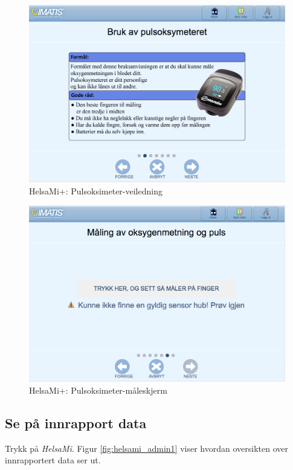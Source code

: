 \begin{figure}
\includegraphics[width=1.0\textwidth,center]{fig/helsami/pulsoksimeter_veiledning}
\caption{HelsaMi+: Pulsoksimeter-veiledning}
\label{fig:helsami_pulsoksimeter_veiledning}
\end{figure}

\begin{figure}
\includegraphics[width=1.0\textwidth,center]{fig/helsami/pulsoksimeter_maaling}
\caption{HelsaMi+: Pulsoksimeter-måleskjerm}
\label{fig:helsami_pulsoksimeter_maaling}
\end{figure}

\subsection{Se på innrapport data}
Trykk på \textit{HelsaMi}. Figur \ref{fig:helsami_admin1} viser hvordan oversikten over innrapportert data ser ut.

